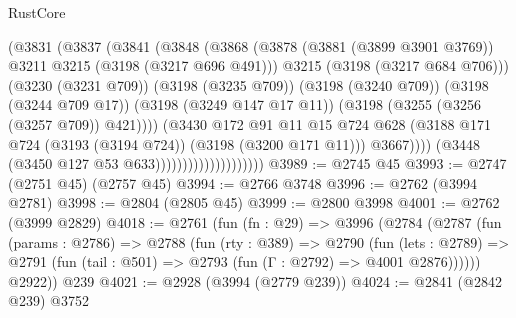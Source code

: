 \begin{lexlean}{RustCore}
\begin{coremodule}
                                          (@3831
                                            (@3837
                                              (@3841
                                                (@3848
                                                  (@3868
                                                    (@3878
                                                      (@3881 (@3899 @3901 @3769))
                                                      @3211
                                                      @3215
                                                      (@3198 (@3217 @696 @491)))
                                                    @3215
                                                    (@3198 (@3217 @684 @706)))
                                                  (@3230 (@3231 @709))
                                                  (@3198 (@3235 @709))
                                                  (@3198 (@3240 @709))
                                                  (@3198 (@3244 @709 @17))
                                                  (@3198 (@3249 @147 @17 @11))
                                                  (@3198 (@3255 (@3256 (@3257 @709)) @421))))
                                              (@3430
                                                @172
                                                @91
                                                @11
                                                @15
                                                @724
                                                @628
                                                (@3188
                                                  @171
                                                  @724
                                                  (@3193 (@3194 @724))
                                                  (@3198 (@3200 @171 @11)))
                                                @3667))))
                                        (@3448 (@3450 @127 @53 @633))))))))))))))))))))
@3989 := @2745 @45
@3993 := @2747 (@2751 @45) (@2757 @45)
@3994 := @2766 @3748
@3996 := @2762 (@3994 @2781)
@3998 := @2804 (@2805 @45)
@3999 := @2800 @3998
@4001 := @2762 (@3999 @2829)
@4018 := @2761
    (fun (fn : @29) =>
    @3996
      (@2784
        (@2787
          (fun (params : @2786) =>
          @2788
            (fun (rty : @389) =>
            @2790
              (fun (lets : @2789) =>
              @2791 (fun (tail : @501) => @2793 (fun (Γ : @2792) => @4001 @2876))))))
        @2922))
    @239
@4021 := @2928 (@3994 (@2779 @239))
@4024 := @2841 (@2842 @239) @3752

\end{coremodule}
\end{lexlean}

